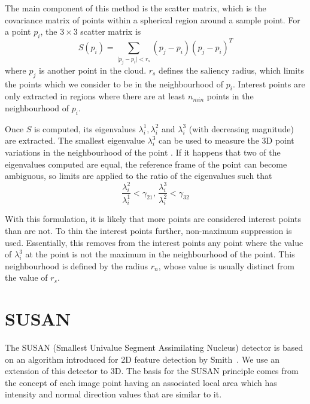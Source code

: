 \documentclass[11pt,a4paper]{kth-mag}
\begin{document}
The main component of this method is the scatter matrix, which is the covariance
matrix of points within a spherical region around a sample point. For a point
$p_i$, the $3\times 3$ scatter matrix is
\begin{equation}
  \label{eq:4}
  S(p_i)=\sum_{\mid p_j - p_i \mid < r_s}(p_j-p_i)(p_j-p_i)^T
\end{equation}
where $p_j$ is another point in the cloud. $r_s$ defines the saliency radius,
which limits the points which we consider to be in the neighbourhood of $p_i$.
Interest points are only extracted in regions where there are at least $n_{min}$
points in the neighbourhood of $p_i$.

Once $S$ is computed, its eigenvalues $\lambda^1_i, \lambda^2_i$ and
$\lambda^3_i$ (with decreasing magnitude) are extracted. The smallest eigenvalue
$\lambda^3_i$ can be used to measure the 3D point variations in the
neighbourhood of the point \cite{zhong2009intrinsic}. If it happens that two of
the eigenvalues computed are equal, the reference frame of the point can become
ambiguous, so limits are applied to the ratio of the eigenvalues such that
\begin{equation}
  \label{eq:8}
  \frac{\lambda^2_i}{\lambda^1_i}< \gamma_{21},\, \frac{\lambda^3_i}{\lambda^2_i}< \gamma_{32}
\end{equation}

With this formulation, it is likely that more points are considered interest
points than are not. To thin the interest points further, non-maximum
suppression is used. Essentially, this removes from the interest points any
point where the value of $\lambda^3_i$ at the point is not the maximum in the
neighbourhood of the point. This neighbourhood is defined by the radius $r_{n}$,
whose value is usually distinct from the value of $r_s$.
\section{SUSAN}
The SUSAN (Smallest Univalue Segment Assimilating Nucleus) detector is based on
an algorithm introduced for 2D feature detection by Smith~\cite{smith1997susan}.
We use an extension of this detector to 3D. The basis for the SUSAN principle
comes from the concept of each image point having an associated local area which
has intensity and normal direction values that are similar to it.
\end{document}
